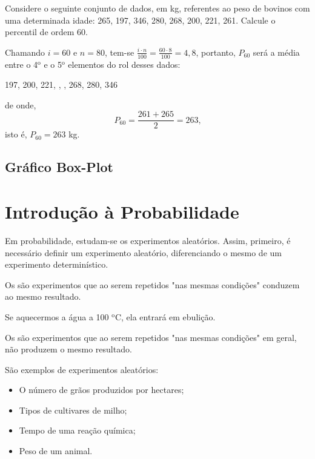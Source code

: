 \documentclass[11pt,fleqn]{book}
\numberwithin{mpicture}{chapter}
\numberwithin{mtable}{chapter}
\numberwithin{mframe}{chapter}
\begin{document}
\begin{example}
	Considere o seguinte conjunto de dados, em kg, referentes ao peso de bovinos com uma determinada idade: 265, 197, 346, 280, 268, 200, 221, 261. Calcule o percentil de ordem 60.
	
	Chamando $i=60$ e $n=80$, tem-se $\frac{i\cdot n}{100}=\frac{60\cdot 8}{100}=4,8$, portanto, $P_{60}$ será a média entre o 4$^{\text{o}}$ e o 5$^{\text{o}}$ elementos do rol desses dados:
	\begin{center}
		197, 200, 221, , , 268, 280, 346\text{,}
	\end{center}
	de onde,
	\[
		P_{60}=\frac{261 + 265}{2}=263\text{,}
	\]
	isto é, $P_{60}=263$ kg.
\end{example}

\section{Gráfico Box-Plot}


\chapter{Introdução à Probabilidade}

Em probabilidade, estudam-se os experimentos aleatórios. Assim, primeiro, é necessário definir um experimento aleatório, diferenciando o mesmo de um experimento determinístico.

\begin{definition}
	Os  são experimentos que ao serem repetidos "nas mesmas condições" conduzem ao mesmo resultado.
\end{definition}

\begin{example}
	Se aquecermos a água a 100 $^{\text{o}}$C, ela entrará em ebulição.
\end{example}

\begin{definition}
	Os  são experimentos que ao serem repetidos "nas mesmas condições" em geral, não produzem o mesmo resultado.
\end{definition}

\begin{example}
	São exemplos de experimentos aleatórios:
	\begin{itemize}
		\item O número de grãos produzidos por hectares;
		\item Tipos de cultivares de milho;
		\item Tempo de uma reação química;
		\item Peso de um animal.
	\end{itemize}
\end{example}
\end{document}
